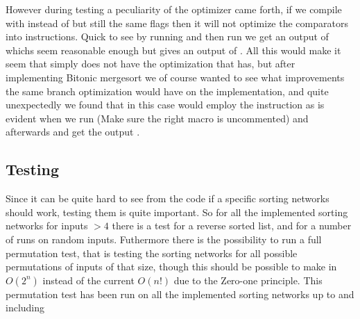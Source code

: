 However during testing a peculiarity of the  optimizer came forth, if
we compile  with  instead of  but still the same
flags then it will not optimize the comparators into  instructions.
Quick to see by running  and then run
 we get an output of
 whichs seem reasonable enough but
 gives an output of
. All this would make it seem that  simply does not have the
optimization that  has, but after implementing Bitonic mergesort we of
course wanted to see what improvements the same branch optimization would have
on the implementation, and quite unexpectedly we found that in this case
 would employ the  instruction as is evident when we run
(Make sure the right macro is uncommented)  and afterwards
 and get the output
.




\subsection{Testing}
Since it can be quite hard to see from the code if a specific sorting networks
should work, testing them is quite important. So for all the implemented
sorting networks for inputs $>4$ there is a test for a reverse sorted list, and
for a number of runs on random inputs. Futhermore there is the possibility to
run a full permutation test, that is testing the sorting networks for all
possible permutations of inputs of that size, though this should be possible to
make in $O(2^n)$ instead of the current $O(n!)$ due to the Zero-one principle.
This permutation test has been run on all the implemented sorting networks up
to and including 
